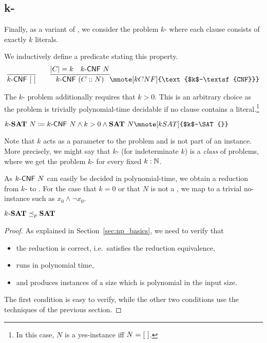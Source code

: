 \newcommand{\kCNF}[1]{\text{$#1$-\textsf{CNF}}}
\subsection{k-\SAT{}}
Finally, as a variant of \SAT{}, we consider the problem $k$-\SAT{} where each clause consists of exactly $k$ literals. 

We inductively define a predicate stating this property.
\begin{align*}
  \infer{\kCNF{k}~\nil}{} \qquad \infer{\kCNF{k}~(C :: N)}{\length{C} = k \quad \kCNF{k}~N}\mnote[kCNF]{\kCNF{k}}
\end{align*}

The $k$-\SAT{} problem additionally requires that $k > 0$. This is an arbitrary choice as the problem is trivially polynomial-time decidable if no clause contains a literal.\footnote{In this case, $N$ is a yes-instance iff $N = [~]$.}
\begin{definition}[$k$-\SAT{}][kSAT]
  $\text{$k$-\SAT{}}~N \defeq \kCNF{k}~N \land k > 0 \land \SAT{}~N \mnote[kSAT]{$k$-\SAT{}}$
\end{definition}

\begin{remark}
  Note that $k$ acts as a parameter to the problem and is not part of an instance. More precisely, we might say that $k$-\SAT{} (for indeterminate $k$) is a \emph{class} of problems, where we get the problem $k$-\SAT{} for every fixed $k : \mathbb{N}$. 
\end{remark}

As $\kCNF{k}~N$ can easily be decided in polynomial-time, we obtain a reduction from $k$-\SAT{} to \SAT{}. For the case that $k = 0$ or that $N$ is not a \kCNF{k}, we map to a trivial no-instance such as $x_0 \land \lnot x_0$. 
\begin{lemma}
  $\text{$k$-\textbf{SAT}{}} \preceq_p{} \textbf{SAT}{}$
\end{lemma}
\begin{proof}
  As explained in Section~\ref{sec:np_basics}, we need to verify that 
  \begin{itemize}
    \item the reduction is correct, i.e.\ satisfies the reduction equivalence, 
    \item runs in polynomial time, 
    \item and produces instances of a size which is polynomial in the input size.
  \end{itemize}
  The first condition is easy to verify, while the other two conditions use the techniques of the previous section.
\end{proof}

